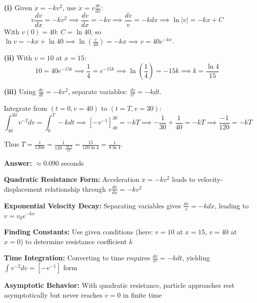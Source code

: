 \begin{solution}
\textbf{(i)} Given $\ddot{x} = -kv^2$, use $\ddot{x} = v\frac{dv}{dx}$:
\[
v\frac{dv}{dx} = -kv^2 \implies \frac{dv}{dx} = -kv \implies \frac{dv}{v} = -kdx \implies \ln|v| = -kx + C
\]
With $v(0)=40$: $C = \ln 40$, so $\ln v = -kx + \ln 40 \implies \ln\left(\frac{v}{40}\right) = -kx \implies v = 40e^{-kx}$.

 \quad {}

\textbf{(ii)} With $v=10$ at $x=15$:
\[
10 = 40e^{-15k} \implies \frac{1}{4} = e^{-15k} \implies \ln\left(\frac{1}{4}\right) = -15k \implies k = \frac{\ln 4}{15}
\]

 \quad {}

\textbf{(iii)} Using $\frac{dv}{dt} = -kv^2$, separate variables: $\frac{dv}{v^2} = -kdt$.

Integrate from $(t=0, v=40)$ to $(t=T, v=30)$:
\[
\int_{40}^{30} v^{-2}dv = \int_0^T -kdt \implies \left[-v^{-1}\right]_{40}^{30} = -kT \implies -\frac{1}{30} + \frac{1}{40} = -kT \implies \frac{-1}{120} = -kT
\]

Thus $T = \frac{1}{120k} = \frac{1}{120 \cdot \frac{\ln 4}{15}} = \frac{15}{120\ln 4} = \frac{1}{8\ln 4}$.

\textbf{Answer:}  $\approx 0.090$ seconds
\end{solution}

\begin{takeaways}
\item \textbf{Quadratic Resistance Form:} Acceleration $\ddot{x} = -kv^2$ leads to velocity-displacement relationship through $v\frac{dv}{dx} = -kv^2$
\item \textbf{Exponential Velocity Decay:} Separating variables gives $\frac{dv}{v} = -kdx$, leading to $v = v_0 e^{-kx}$
\item \textbf{Finding Constants:} Use given conditions (here: $v=10$ at $x=15$, $v=40$ at $x=0$) to determine resistance coefficient $k$
\item \textbf{Time Integration:} Converting to time requires $\frac{dv}{v^2} = -kdt$, yielding $\int v^{-2}dv = [-v^{-1}]$ form
\item \textbf{Asymptotic Behavior:} With quadratic resistance, particle approaches rest asymptotically but never reaches $v=0$ in finite time
\end{takeaways}

\newpage

